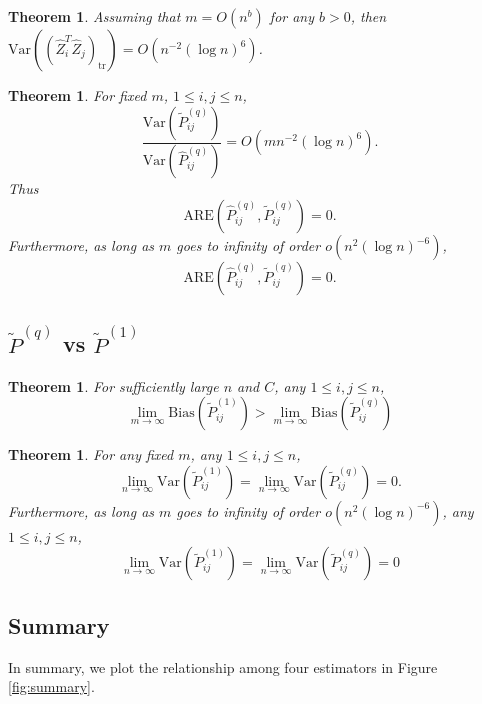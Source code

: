 \documentclass[a4paper]{article}
\newtheorem{theorem}[fact]{Theorem}
\renewcommand{\hat}{\widehat}
\begin{document}
\begin{theorem}
\label{thm:VarASELq}
Assuming that $m = O(n^b)$ for any $b > 0$, then $\mathrm{Var}((\hat{Z}_i^T \hat{Z}_j)_{\mathrm{tr}}) = O(n^{-2} (\log n)^6)$.
\end{theorem}

\begin{theorem}
\label{thm:ARELq}
For fixed $m$, $1 \le i, j \le n$,
\[
	\frac{\mathrm{Var}(\widetilde{P}_{ij}^{(q)})}{\mathrm{Var}(\hat{P}_{ij}^{(q)})}
    = O(m n^{-2} (\log n)^6).
\]
Thus
\[
	\mathrm{ARE}(\hat{P}_{ij}^{(q)}, \widetilde{P}_{ij}^{(q)}) = 0.
\]
Furthermore, as long as $m$ goes to infinity of order $o(n^2 (\log n)^{-6})$,
\[
	\mathrm{ARE}(\hat{P}_{ij}^{(q)}, \widetilde{P}_{ij}^{(q)}) = 0.
\]
\end{theorem}




\subsection{$\widetilde{P}^{(q)}$ vs $\widetilde{P}^{(1)}$}

\begin{theorem}
\label{thm:biasL1andLq}
For sufficiently large $n$ and $C$, any $1 \le i,j \le n$,
\[
	\lim_{m \to \infty} \mathrm{Bias}(\widetilde{P}_{ij}^{(1)})
    > \lim_{m \to \infty} \mathrm{Bias}(\widetilde{P}_{ij}^{(q)})
\]
\end{theorem}

\begin{theorem}
\label{thm:varianceL1andLq}
For any fixed $m$, any $1 \le i,j \le n$,
\[
	\lim_{n \to \infty} \mathrm{Var}(\widetilde{P}_{ij}^{(1)})
    = \lim_{n \to \infty} \mathrm{Var}(\widetilde{P}_{ij}^{(q)}) = 0.
\]
Furthermore, as long as $m$ goes to infinity of order $o(n^2 (\log n)^{-6})$, any $1 \le i,j \le n$,
\[
	\lim_{n \to \infty} \mathrm{Var}(\widetilde{P}_{ij}^{(1)})
    = \lim_{n \to \infty} \mathrm{Var}(\widetilde{P}_{ij}^{(q)}) = 0
\]
\end{theorem}






\subsection{Summary}
In summary, we plot the relationship among four estimators in Figure \ref{fig:summary}.
\end{document}
